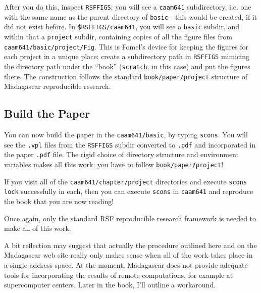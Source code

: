 After you do this, inspect {\tt RSFFIGS}: you will see a {\tt caam641} subdirectory, i.e. one with the same name as the parent directory of {\tt basic} - this would be created, if it did not exist before. In {\tt \$RSFFIGS/caam641}, you will see a {\tt basic} subdir, and within that a {\tt project} subdir, containing copies of all the figure files from {\tt caam641/basic/project/Fig}. This is Fomel's device for keeping the figures for each project in a unique place: create a subdirectory path in {\tt RSFFIGS} mimicing the directory path under the ``book'' ({\tt scratch}, in this case) and put the figures there. The construction follows the standard {\tt book/paper/project} structure of Madagascar reproducible research.

\subsection{Build the Paper}
You can now build the paper in the {\tt caam641/basic}, by typing {\tt scons}. You will see the {\tt .vpl} files from the {\tt RSFFIGS} subdir converted to {\tt .pdf} and incorporated in the paper {\tt .pdf} file. The rigid choice of directory structure and environment variables makes all this work: you have to follow {\tt book/paper/project}!

If you visit all of the {\tt caam641/chapter/project} directories and execute {\tt scons lock} successfully in each, then you can execute {\tt scons} in {\tt caam641} and reproduce the book that you are now reading!
 
Once again, only the standard RSF reproducible research framework is needed to make all of this work.

A bit reflection may suggest that actually the procedure outlined here and on the Madagascar web site really only makes sense when all of the work takes place in a single address space. At the moment, Madagascar does not provide adequate tools for incorporating the results of remote computations, for example at supercomputer centers. Later in the book, I'll outline a workaround.

